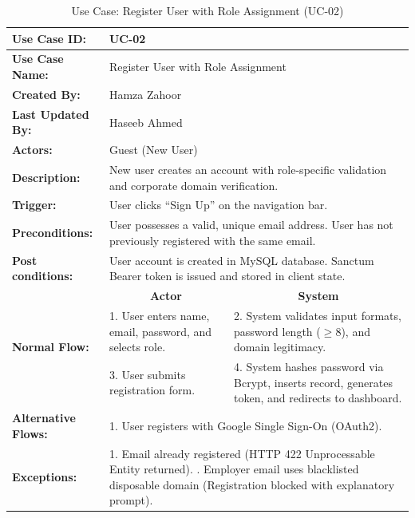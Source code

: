 \begin{table}[H]
\centering
\small
\caption{Use Case: Register User with Role Assignment (UC-02)}
\label{tab:uc02_spec}
\begin{tabular}{|p{3.2cm}|p{5.5cm}|p{5.5cm}|}
\hline
\textbf{Use Case ID:} & \multicolumn{2}{p{11.4cm}|}{UC-02} \\ \hline
\textbf{Use Case Name:} & \multicolumn{2}{p{11.4cm}|}{Register User with Role Assignment} \\ \hline
\textbf{Created By:} & \multicolumn{2}{p{11.4cm}|}{Hamza Zahoor} \\ \hline
\textbf{Last Updated By:} & \multicolumn{2}{p{11.4cm}|}{Haseeb Ahmed} \\ \hline
\textbf{Actors:} & \multicolumn{2}{p{11.4cm}|}{Guest (New User)} \\ \hline
\textbf{Description:} & \multicolumn{2}{p{11.4cm}|}{New user creates an account with role-specific validation and corporate domain verification.} \\ \hline
\textbf{Trigger:} & \multicolumn{2}{p{11.4cm}|}{User clicks ``Sign Up'' on the navigation bar.} \\ \hline
\textbf{Preconditions:} & \multicolumn{2}{p{11.4cm}|}{User possesses a valid, unique email address. \newline User has not previously registered with the same email.} \\ \hline
\textbf{Post conditions:} & \multicolumn{2}{p{11.4cm}|}{User account is created in MySQL database. \newline Sanctum Bearer token is issued and stored in client state.} \\ \hline
\multirow{3}{*}{\textbf{Normal Flow:}} & \multicolumn{1}{c|}{\textbf{Actor}} & \multicolumn{1}{c|}{\textbf{System}} \\ \cline{2-3}
& 1. User enters name, email, password, and selects role. & 2. System validates input formats, password length ($\ge 8$), and domain legitimacy. \vspace{2pt} \\
& 3. User submits registration form. & 4. System hashes password via Bcrypt, inserts record, generates token, and redirects to dashboard. \\ \hline
\textbf{Alternative Flows:} & \multicolumn{2}{p{11.4cm}|}{1. User registers with Google Single Sign-On (OAuth2).} \\ \hline
\textbf{Exceptions:} & \multicolumn{2}{p{11.4cm}|}{1. Email already registered (HTTP 422 Unprocessable Entity returned). \newline 2. Employer email uses blacklisted disposable domain (Registration blocked with explanatory prompt).} \\ \hline
\end{tabular}
\end{table}

